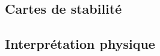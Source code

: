 \subsection{Cartes de stabilité}

\subsection{Interprétation physique}








































